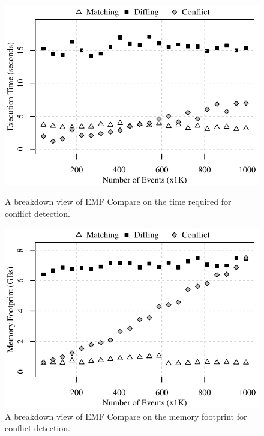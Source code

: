 \begin{figure}[]
  \centering
  \begin{minipage}[b]{0.490\textwidth}
    \includegraphics[width=\linewidth]{emfc-conflict-time-events}
    \caption{A breakdown view of EMF Compare on the time required for conflict detection.}
    \label{fig:emfc-conflict-time-events}
  \end{minipage}
  \hfill
  \begin{minipage}[b]{0.490\textwidth}
    \includegraphics[width=\linewidth]{emfc-conflict-memory-events}
    \caption{A breakdown view of EMF Compare on the memory footprint for conflict detection.}
    \label{fig:emfc-conflict-memory-events}
  \end{minipage}
\end{figure}

